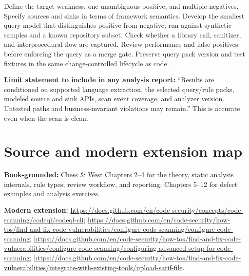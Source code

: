 \documentclass[
  letterpaper,
]{article}
\begin{document}
Define the target weakness, one unambiguous positive, and multiple
negatives. Specify sources and sinks in terms of framework semantics.
Develop the smallest query model that distinguishes positive from
negative; run against synthetic samples and a known repository subset.
Check whether a library call, sanitizer, and interprocedural flow are
captured. Review performance and false positives before enforcing the
query as a merge gate. Preserve query pack version and test fixtures in
the same change-controlled lifecycle as code.

\textbf{Limit statement to include in any analysis report:} ``Results
are conditioned on supported language extraction, the selected
query/rule packs, modeled source and sink APIs, scan event coverage, and
analyzer version. Untested paths and business-invariant violations may
remain.'' This is accurate even when the scan is clean.

\section{Source and modern extension
map}\label{source-and-modern-extension-map}

\textbf{Book-grounded:} Chess \& West Chapters 2--4 for the theory,
static analysis internals, rule types, review workflow, and reporting;
Chapters 5--12 for defect examples and analysis exercises.

\textbf{Modern extension:}
\url{https://docs.github.com/en/code-security/concepts/code-scanning/codeql/codeql-cli};
\url{https://docs.github.com/en/code-security/how-tos/find-and-fix-code-vulnerabilities/configure-code-scanning/configure-code-scanning};
\url{https://docs.github.com/en/code-security/how-tos/find-and-fix-code-vulnerabilities/configure-code-scanning/configuring-advanced-setup-for-code-scanning};
\url{https://docs.github.com/en/code-security/how-tos/find-and-fix-code-vulnerabilities/integrate-with-existing-tools/upload-sarif-file}.
\end{document}
